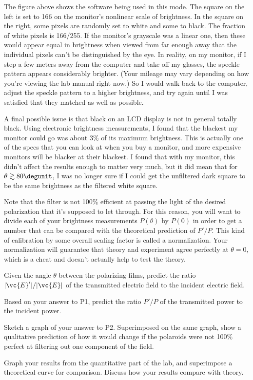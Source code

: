 
The figure above shows the software being used in this mode. The square on the left
is set to 166 on the monitor's nonlinear scale of brightness. In the square on the right,
some pixels are randomly set to white and some to black. The fraction of white pixels
is 166/255. If the monitor's grayscale was a linear one, then these would appear
equal in brightness when viewed from far enough away that the individual pixels can't
be distinguished by the eye. In reality, on my monitor, if I step a few meters away from the computer and
take off my glasses, the speckle pattern appears considerably brighter. (Your mileage may
vary depending on how you're viewing the lab manual right now.) So I would walk back to the
computer, adjust the speckle pattern to a higher brightness, and try again until I was
satisfied that they matched as well as possible.

A final possible issue is that black on an LCD display is not in general totally black.
Using electronic brightness measurements, I found that the blackest my monitor could go
was about 3\% of its maximum brightness. This is actually one of the specs that you can
look at when you buy a monitor, and more expensive monitors will be blacker at their blackest.
I found that with my monitor, this didn't affect the results enough to matter very much,
but it did mean that for $\theta\gtrsim 80\degunit$, I was no longer sure if I could
get the unfiltered dark square to be the same brightness as the filtered white square.

Note that the filter is not 100\% efficient at passing the light of the desired polarization
that it's supposed to let through. For this reason, you will want to divide each of your
brightness measurements $P(\theta)$ by $P(0)$ in order to get a number that can be
compared with the theoretical prediction of $P'/P$. This kind of calibration by
some overall scaling factor is called a normalization. Your normalization will guarantee
that theory and experiment agree perfectly at $\theta=0$, which is a cheat and doesn't
actually help to test the theory.

\prelab

\prelabquestion Given the angle $\theta$ between the polarizing films, predict the 
ratio $|\vc{E}'|/|\vc{E}|$ of the transmitted electric field to the incident
electric field.

\prelabquestion Based on your answer to P1, predict the ratio $P'/P$ of the transmitted
power to the incident power.

\prelabquestion Sketch a graph of your answer to P2. Superimposed on the same graph, show
a qualitative prediction of how it would change if the polaroids were not
100\% perfect at filtering out one component of the field.

\analysis

Graph your results from the quantitative part of the lab, and superimpose a
theoretical curve for comparison. Discuss how your results
compare with theory.

